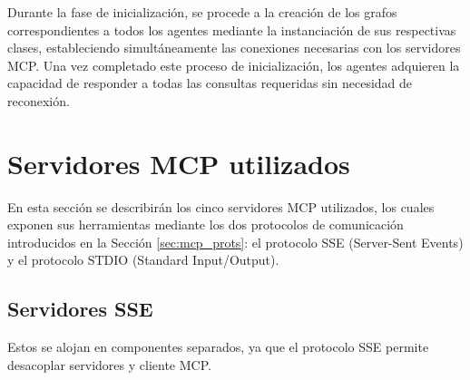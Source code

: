 Durante la fase de inicialización, se procede a la creación de los grafos correspondientes a todos los agentes mediante la instanciación de sus respectivas clases, estableciendo simultáneamente las conexiones necesarias con los servidores MCP. Una vez completado este proceso de inicialización, los agentes adquieren la capacidad de responder a todas las consultas requeridas sin necesidad de reconexión. 

\section{Servidores MCP utilizados}
En esta sección se describirán los cinco servidores MCP utilizados, los cuales exponen sus herramientas mediante los dos protocolos de comunicación introducidos en la Sección \ref{sec:mcp_prots}: el protocolo SSE (Server-Sent Events) y el protocolo STDIO (Standard Input/Output).

\subsection{Servidores SSE}
Estos se alojan en componentes separados, ya que el protocolo SSE permite desacoplar servidores y cliente MCP.


